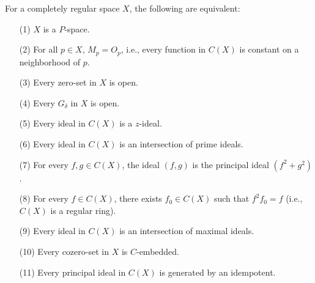 For a completely regular space \(X\), the following are equivalent:

\begin{enumerate}
\item[(1)] \(X\) is a \(P\)-space.
\item[(2)] For all \(p \in X\), \(M_p = O_p\), i.e., every function in \(C(X)\) is constant on a neighborhood of \(p\).
\item[(3)] Every zero-set in \(X\) is open.
\item[(4)] Every \(G_{\delta}\) in \(X\) is open.
\item[(5)] Every ideal in \(C(X)\) is a \(z\)-ideal.
\item[(6)] Every ideal in \(C(X)\) is an intersection of prime ideals.
\item[(7)] For every \(f, g \in C(X)\), the ideal \((f,g)\) is the principal ideal \((f^2 + g^2)\).
\item[(8)] For every \(f \in C(X)\), there exists \(f_0 \in C(X)\) such that \(f^2 f_0 = f\) (i.e., \(C(X)\) is a regular ring).
\item[(9)] Every ideal in \(C(X)\) is an intersection of maximal ideals.
\item[(10)] Every cozero-set in \(X\) is \(C\)-embedded.
\item[(11)] Every principal ideal in \(C(X)\) is generated by an idempotent.
\end{enumerate}
